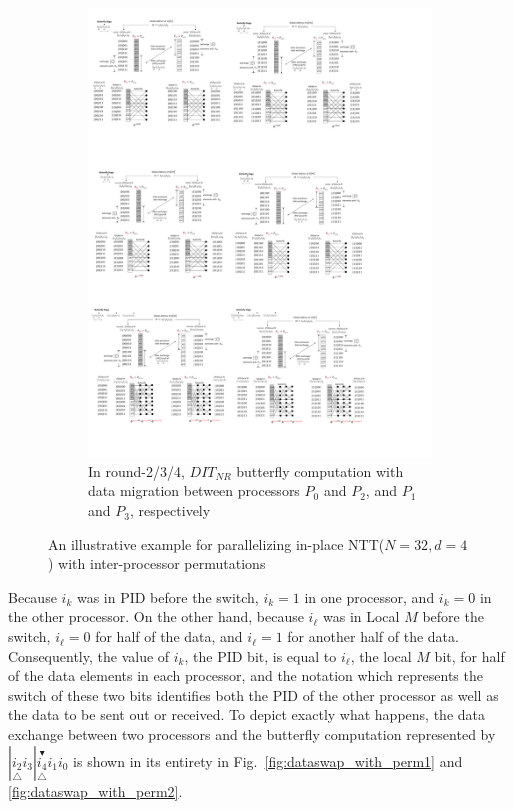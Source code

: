 \documentclass[submission]{iacrtrans}
\theoremstyle{plain}
\begin{document}
\begin{figure}[!tb]
\begin{subfigure}[b]{.95\textwidth}
\includegraphics[width=\textwidth]{./fig/DataSwapWithPerm3.pdf}
\caption{In round-2/3/4, $DIT_{NR}$ butterfly computation with data migration between processors $P_0$ and $P_2$, and $P_1$ and $P_3$, respectively}\label{fig:dataswap_with_perm3}
\end{subfigure}
\caption{An illustrative example for parallelizing in-place NTT($N=32,d=4$) with inter-processor permutations}\label{fig:dataswap_with_perm}
\end{figure}

Because $i_k$ was in PID before the switch, $i_k=1$ in one processor, and $i_k=0$ in the other processor. On the other hand, because $i_{\ell}$ was in Local $M$ before the switch, $i_{\ell}=0$ for half of the data, and $i_{\ell}=1$ for another half of the data. Consequently, the value of $i_k$, the PID bit, is equal to $i_{\ell}$, the local $M$ bit, for half of the data elements in each processor, and the notation which represents the switch of these two bits identifies both the PID of the other processor as well as the data to be sent out or received. To depict exactly what happens, the data exchange between two processors and the butterfly computation represented by $|\underset{\triangle}{i_2}i_3|\underset{\triangle}{\overset{\blacktriangledown}{i_4}}i_1i_0$ is shown in its entirety in Fig.~\ref{fig:dataswap_with_perm1} and \ref{fig:dataswap_with_perm2}.
\end{document}
